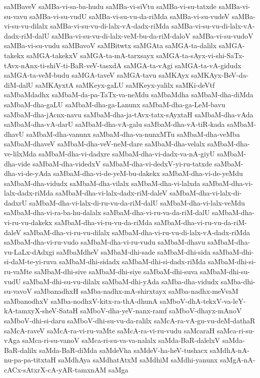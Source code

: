 {saMBaveV
saMBa-vi-sa-ba-hudu
saMBa-vi-siVtu
saMBa-vi-su-tatxde
saMBa-vi-su-vavu
saMBa-vi-su-vudU
saMBa-vi-su-vu-da-riMda
saMBa-vi-su-vudeV
saMBa-vi-su-vu-dilalx
saMBa-vi-su-vu-di-lalx-vA-dadx-riMda
saMBa-vi-su-vu-di-lalx-vA-dadx-riM-dalU
saMBa-vi-su-vu-di-lalx-veM-bu-da-riM-daloV
saMBa-vi-su-vudoV
saMBa-vi-su-vudu
saMBavoV
saMBitwtx
saMGAta
saMGA-ta-dalilx
saMGA-takekx
saMGA-takekxV
saMGA-ta-mA-tarxsayx
saMGA-ta-sAyx-vi-shi-SaTx-tAvx-nAnx-ti-shiV-ti-BaR-veV-tasxdA
saMGA-ta-vAgi
saMGA-ta-vA-gidudx
saMGA-ta-veM-budu
saMGA-taveV
saMGA-tavu
saMKAyx
saMKAyx-BeV-da-diM-dalU
saMKAyxtA
saMKeyx-gaLU
saMKeyx-yalilx
saMKi-deVtf
saMbaMdadhx
saMbaM-da-pa-TaTx-va-neMdu
saMbaMdha
saMbaM-dha-diMda
saMbaM-dha-gaLU
saMbaM-dha-ga-Lanunx
saMbaM-dha-ga-LeM-bavu
saMbaM-dha-jAcnx-navu
saMbaM-dha-ja-tAvx-tatx-sAyxtaH
saMbaM-dha-vAda
saMbaM-dha-vA-darU
saMbaM-dha-vA-galu
saMbaM-dha-vA-tiR-kada
saMbaM-dhavU
saMbaM-dha-vanunx
saMbaM-dha-va-nunxMTu
saMbaM-dha-veMba
saMbaM-dhaveV
saMbaM-dha-veV-neM-dare
saMbaM-dha-velalx
saMbaM-dha-ve-lilxMda
saMbaM-dha-vi-dadxre
saMbaM-dha-vi-dadx-va-nA-giyU
saMbaM-dha-vide
saMbaM-dha-videdxV
saMbaM-dha-vi-dedxV-yi-ru-tatxde
saMbaM-dha-vi-de-yAda
saMbaM-dha-vi-de-yeM-bu-dakekx
saMbaM-dha-vi-de-yeMdu
saMbaM-dha-vidudx
saMbaM-dha-vilalx
saMbaM-dha-vi-lalxda
saMbaM-dha-vi-lalx-dadx-riMda
saMbaM-dha-vi-lalx-dadx-riM-daleV
saMbaM-dha-vi-lalx-di-dadxrU
saMbaM-dha-vi-lalx-di-ru-vu-da-riM-dalU
saMbaM-dha-vi-lalx-veMdu
saMbaM-dha-vi-ra-ba-hu-dalalx
saMbaM-dha-vi-ru-va-da-riM-dalU
saMbaM-dha-vi-ru-vu-dakekx
saMbaM-dha-vi-ru-vu-da-riMda
saMbaM-dha-vi-ru-vu-da-riM-daleV
saMbaM-dha-vi-ru-vu-dilalx
saMbaM-dha-vi-ru-vu-di-lalx-vA-dadx-riMda
saMbaM-dha-vi-ru-vudo
saMbaM-dha-vi-ru-vudu
saMbaM-dhavu
saMbaM-dha-vu-LaLx-dAdxgi
saMbaMdheV
saMbaM-dhi-sade
saMbaM-dhi-sida
saMbaM-dhi-si-daM-te-yi-ruva
saMbaM-dhi-sidadx
saMbaM-dhi-si-dadx-riMda
saMbaM-dhi-si-ru-vaMte
saMbaM-dhi-sive
saMbaM-dhi-siye
saMbaM-dhi-suva
saMbaM-dhi-su-vudU
saMbaM-dhi-su-vu-dilalx
saMbaM-dhi-yAda
saMba-dha-vidudx
saMba-dhi-su-vavoV
saMbanadhxH
saMba-nadhx-mA-shirxtayx
saMba-nadhx-meVvaM
saMbanodhxV
saMba-nodhxV-kitx-ra-thA-dhunA
saMboV-dhA-tekxV-va-leY-kA-tamxyX-sheV-SataH
saMboV-dha-yeV-nanx-ramf
saMboV-dhayx-mAnoV
saMboV-dhi-si-daru
saMboV-dhi-su-vu-da-ralilx
saMcA-ra-vA-gu-vu-deM-dathaR
saMcA-raveV
saMcA-ra-vi-ru-vaMte
saMcA-ra-vi-ru-vudu
saMcaraH
saMca-ri-su-vAga
saMca-ri-su-vanoV
saMca-ri-su-va-va-nalalx
saMda-BaR-dalelxV
saMda-BaR-dalilx
saMda-BaR-diMda
saMdeVha
saMdeV-ha-heV-tushacx
saMdhA-nA-nu-pa-pa-titxtaH
saMdhAya
saMdhatAtxM
saMdhiM
saMdhi-yanunx
saMgA-nA-cACx-sAtxrX-cA-yAR-tamxnAM
saMga
}
